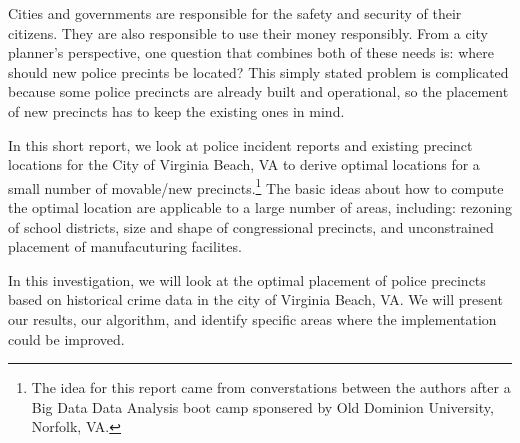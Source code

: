 Cities and governments are responsible for the safety and security of their citizens.  They are also responsible to use their money responsibly.  From a city planner's perspective, one question that combines both of these needs is: where should new police precints be located?  This simply stated problem is complicated because some police precincts are already built and operational, so the placement of new precincts has to keep the existing ones in mind.

In this short report, we look at police incident reports and existing precinct locations for the City of Virginia Beach, VA to derive optimal locations for a small number of movable/new precincts.\footnote{The idea for this report came from converstations between the authors after a Big Data Data Analysis boot camp sponsered by Old Dominion University, Norfolk, VA.}  The basic ideas about how to compute the optimal location are applicable to a large number of areas, including: rezoning of school districts, size and shape of congressional precincts, and unconstrained placement of manufacuturing facilites.

In this investigation, we will look at the optimal placement of police precincts based on historical crime data in the city of Virginia Beach, VA.  We will present our results, our algorithm, and identify specific areas where the implementation could be improved.
